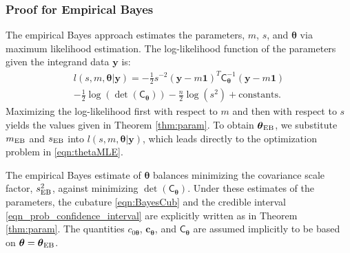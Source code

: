 \documentclass[twocolumn]{svjour3}          %
\newcommand{\bm}[1]{\boldsymbol{#1}}
\newcommand{\vtheta}{{\bm{\theta}}}
\newcommand{\vc}{\bm{c}}
\newcommand{\vy}{\bm{y}}
\newcommand{\vone}{\bm{1}}
\newcommand{\mC}{\mathsf{C}}
\newcommand{\mCInv}{\mathsf{C}^{-1}}
\newcommand{\MLE}{\textup{EB}}
\begin{document}
\subsubsection{Proof for Empirical Bayes}  \label{sec:MLE}
The empirical Bayes approach estimates the parameters, $m$, $s$, and $\vtheta$ via maximum likelihood estimation.  The log-likelihood function of the parameters given the integrand data $\vy$ is:
\begin{multline*}
l(s,m,\vtheta | \vy)
= -\frac{1}{2} s^{-2} (\vy-m\vone)^T\mCInv_\vtheta(\vy-m\vone) 
\\
 - \frac{1}{2} \log(\det(\mC_\vtheta)) - \frac{n}{2} \log(s^2) + \text{constants.}
\end{multline*}
Maximizing the log-likelihood first with respect to $m$ and then with respect to $s$ yields the values given in Theorem \ref{thm:param}.
To obtain $\vtheta_\MLE$, we substitute $m_\MLE$ and $s_\MLE$ into $l(s,m,\vtheta | \vy)$, which leads directly to the optimization problem in \eqref{eqn:thetaMLE}.

The empirical Bayes estimate of $\vtheta$ balances minimizing the covariance scale factor, $s^2_{\MLE}$, against minimizing  $\det(\mC_\vtheta)$. 
Under these estimates of the parameters, the cubature \eqref{eqn:BayesCub} and the credible interval \eqref{eqn_prob_confidence_interval} are explicitly written as in Theorem \ref{thm:param}.
The quantities $c_{0\vtheta}$, $\vc_\vtheta$, and $\mC_\vtheta$ are assumed implicitly to be based on $\vtheta = \vtheta_\MLE$.   


\end{document}
